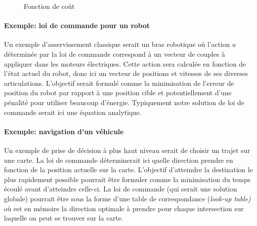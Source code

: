 \begin{figure}[H]
	\centering
	\vspace{-10pt}
		\caption{Fonction de coût}
		\label{fig:cost}
\end{figure}





\paragraph{Exemple: loi de commande pour un robot}

Un exemple d'asservissement classique serait un bras robotique où l'action $u$ déterminée par la loi de commande correspond à un vecteur de couples à appliquer dans les moteurs électriques. Cette action sera calculée en fonction de l'état actuel du robot, donc ici un vecteur de positions et vitesses de ses diverses articulations. L'objectif serait formulé comme la minimisation de l'erreur de position du robot par rapport à une position cible et potentiellement d'une pénalité pour utiliser beaucoup d'énergie. Typiquement notre solution de loi de commande serait ici une équation analytique.

\paragraph{Exemple: navigation d'un véhicule}

Un exemple de prise de décision à plus haut niveau serait de choisir un trajet sur une carte. La loi de commande déterminerait ici quelle direction prendre en fonction de la position actuelle sur la carte. L'objectif d'atteindre la destination le plus rapidement possible pourrait être formuler comme la minimisation du temps écoulé avant d'atteindre celle-ci. La loi de commande (qui serait une solution globale) pourrait être sous la forme d'une table de correspondance (\textit{look-up table)} où est en mémoire la direction optimale à prendre pour chaque intersection sur laquelle on peut se trouver sur la carte.

